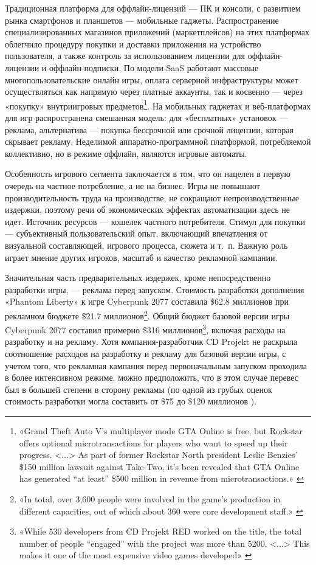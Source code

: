 \documentclass{article}
\begin{document}
Традиционная платформа для оффлайн-лицензий — ПК и консоли, с развитием рынка смартфонов и планшетов — мобильные гаджеты. Распространение специализированных магазинов приложений (маркетплейсов) на этих платформах облегчило процедуру покупки и доставки приложения на устройство пользователя, а также контроль за использованием лицензии для оффлайн-лицензии и оффлайн-подписки. По модели SaaS работают массовые многопользовательские онлайн игры, оплата серверной инфраструктуры может осуществляться как напрямую через платные аккаунты, так и косвенно — через «покупку» внутриигровых предметов\footnote{«Grand Theft Auto V's multiplayer mode GTA Online is free, but Rockstar offers optional microtransactions for players who want to speed up their progress. <...> As part of former Rockstar North president Leslie Benzies' \$150 million lawsuit against Take-Two, it's been revealed that GTA Online has generated “at least” \$500 million in revenue from microtransactions.» \cite{gtaOnlineHalfBillionMicrotrasacts}}. На мобильных гаджетах и веб-платформах для игр распространена смешанная модель: для «бесплатных» установок — реклама, альтернатива — покупка бессрочной или срочной лицензии, которая скрывает рекламу. Неделимой аппаратно-программной платформой, потребляемой коллективно, но в режиме оффлайн, являются игровые автоматы.

Особенность игрового сегмента заключается в том, что он нацелен в первую очередь на частное потребление, а не на бизнес. Игры не повышают производительность труда на производстве, не сокращают непроизводственные издержки, поэтому речи об экономических эффектах автоматизации здесь не идет. Источник ресурсов — кошелек частного потребителя. Стимул для покупки — субъективный пользовательский опыт, включающий впечатления от визуальной составляющей, игрового процесса, сюжета и т.~п. Важную роль играет мнение других игроков, масштаб и качество рекламной кампании.

Значительная часть предварительных издержек, кроме непосредственно разработки игры, — реклама перед запуском. Стоимость разработки дополнения «Phantom Liberty» к игре Cyberpunk 2077 составила \$62.8 миллионов при рекламном бюджете \$21.7 миллионов\footnote{«In total, over 3,600 people were involved in the game’s production in different capacities, out of which about 360 were core development staff.» \cite{cyberpunkMarketingBudget}}. Общий бюджет базовой версии игры Cyberpunk 2077 составил примерно \$316 миллионов\footnote{«While 530 developers from CD Projekt RED worked on the title, the total number of people “engaged” with the project was more than 5200. <...> This makes it one of the most expensive video games developed» \cite{cyberpunkTotalBudget}}, включая расходы на разработку и на рекламу. Хотя компания-разработчик CD Projekt не раскрыла соотношение расходов на разработку и рекламу для базовой версии игры, с учетом того, что рекламная кампания перед первоначальным запуском проходила в более интенсивном режиме, можно предположить, что в этом случае перевес был в большей степени в сторону рекламы (по одной из грубых оценок стоимость разработки могла составить от \$75 до \$120 миллионов \cite{cyberpunkDevBudgetEstimate}).
\end{document}
